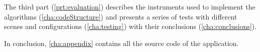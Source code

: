 \documentclass[dissertation.tex]{subfiles}
\begin{document}
The third part (\cref{prt:evaluation}) describes the instruments used
to implement the algorithms (\cref{cha:codeStructure}) and presents
a series of tests with
different scenes and configurations (\cref{cha:testing}) with their
conclusions (\cref{cha:conclusions}).

In conclusion, \cref{cha:appendix} contains all the source code of the
application.
\end{document}
